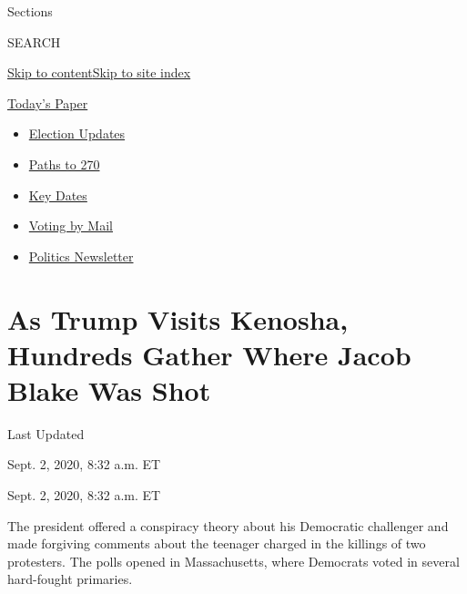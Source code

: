 Sections

SEARCH

\protect\hyperlink{site-content}{Skip to
content}\protect\hyperlink{site-index}{Skip to site index}

\href{https://myaccount.nytimes3xbfgragh.onion/auth/login?response_type=cookie\&client_id=vi}{}

\href{https://www.nytimes3xbfgragh.onion/section/todayspaper}{Today's
Paper}

\begin{itemize}
\item
  \href{https://www.nytimes3xbfgragh.onion/live/2020/09/11/us/trump-vs-biden?action=click\&pgtype=Article\&state=default\&region=TOP_BANNER\&context=storylines_menu}{Election
  Updates}
\item
  \href{https://www.nytimes3xbfgragh.onion/interactive/2020/us/elections/election-states-biden-trump.html?action=click\&pgtype=Article\&state=default\&region=TOP_BANNER\&context=storylines_menu}{Paths
  to 270}
\item
  \href{https://www.nytimes3xbfgragh.onion/interactive/2019/us/elections/2020-presidential-election-calendar.html?action=click\&pgtype=Article\&state=default\&region=TOP_BANNER\&context=storylines_menu}{Key
  Dates}
\item
  \href{https://www.nytimes3xbfgragh.onion/interactive/2020/08/31/us/politics/vote-by-mail-deadlines.html?action=click\&pgtype=Article\&state=default\&region=TOP_BANNER\&context=storylines_menu}{Voting
  by Mail}
\item
  \href{https://www.nytimes3xbfgragh.onion/newsletters/politics?action=click\&pgtype=Article\&state=default\&region=TOP_BANNER\&context=storylines_menu}{Politics
  Newsletter}
\end{itemize}

\hypertarget{as-trump-visits-kenosha-hundreds-gather-where-jacob-blake-was-shot}{%
\section{As Trump Visits Kenosha, Hundreds Gather Where Jacob Blake Was
Shot}\label{as-trump-visits-kenosha-hundreds-gather-where-jacob-blake-was-shot}}

Last Updated

Sept. 2, 2020, 8:32 a.m. ET

Sept. 2, 2020, 8:32 a.m. ET

The president offered a conspiracy theory about his Democratic
challenger and made forgiving comments about the teenager charged in the
killings of two protesters. The polls opened in Massachusetts, where
Democrats voted in several hard-fought primaries.

